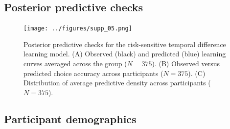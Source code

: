 \documentclass[a4paper,notitlepage,12pt]{article}
\begin{document}
\clearpage

\subsection*{Posterior predictive checks}
\begin{figure}[H]
    \texttt{[image: ../figures/supp\_05.png]}
    \centering
    \caption{Posterior predictive checks for the risk-sensitive temporal difference learning model. (A) Observed (black) and predicted (blue) learning curves averaged across the group ($N=375$). (B) Observed versus predicted choice accuracy across participants ($N=375$). (C) Distribution of average predictive density across participants ($N=375$).}
    \label{fig:figS05}
\end{figure}

\clearpage
\subsection*{Participant demographics}
\end{document}

